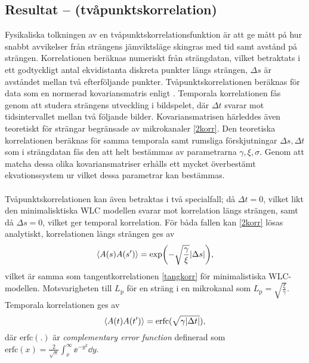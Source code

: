 \subsection{Resultat -- (tvåpunktskorrelation)}


Fysikaliska tolkningen av en tvåpunktskorrelationsfunktion är att ge mått på hur snabbt avvikelser från strängens jämviktsläge skingras med tid samt avstånd på strängen. Korrelationen beräknas numeriskt från strängdatan, vilket betraktats i ett godtyckligt antal ekvidistanta diskreta punkter längs strängen, $\Delta s$ är avståndet mellan två efterföljande punkter. Tvåpunktskorrelationen beräknas för data som en normerad kovariansmatris enligt . Temporala korrelationen fås genom att studera strängens utveckling i bildspelet, där $\Delta t$ svarar mot tidsintervallet mellan två följande bilder. Kovariansmatrisen härleddes även teoretiskt för strängar begränsade av mikrokanaler \eqref{2korr}. Den teoretiska korrelationen  beräknas för samma temporala samt rumsliga förskjutningar $\Delta s, \Delta t$ som i strängdatan fås den att helt bestämmas av parametrarna $\gamma,\xi,\sigma$. Genom att matcha dessa olika kovariansmatriser erhålls ett mycket överbestämt ekvationssystem ur vilket dessa parametrar kan bestämmas.
 \\ \\
Tvåpunktskorrelationen kan även betraktas i två specialfall; då $\Delta t=0$, vilket likt den minimalisktiska WLC modellen svarar mot korrelation längs strängen, samt då $\Delta s=0$, vilket ger temporal korrelation. För båda fallen kan \eqref{2korr} lösas analytiskt, korrelationen längs strängen ges av
\begin{equation}\label{eq:tangentkorr}
\ev{A(s)A(s')}=\exp(-\sqrt{\frac{\gamma}{\xi}}\abs{\Delta s}),
\end{equation}
vilket är samma som tangentkorrelationen \eqref{tangkorr} för minimalistiska WLC-modellen. Motsvarigheten till $L_{\text{p}}$ för en sträng i en mikrokanal som $L_\text{p}=\sqrt{\frac{\xi}{\gamma}}$.
Temporala korrelationen ges av
\begin{equation}
    \ev{A(t)A(t')}=\mathrm{erfc}(\sqrt{\gamma\abs{\Delta t}}),
\end{equation}
där $\mathrm{erfc}(.)$ är \emph{complementary error function} definerad som $\mathrm{erfc}(x)=\frac{2}{\sqrt{\pi}}\int_{x}^{\infty}\ee^{-y^2}\dd y$.

